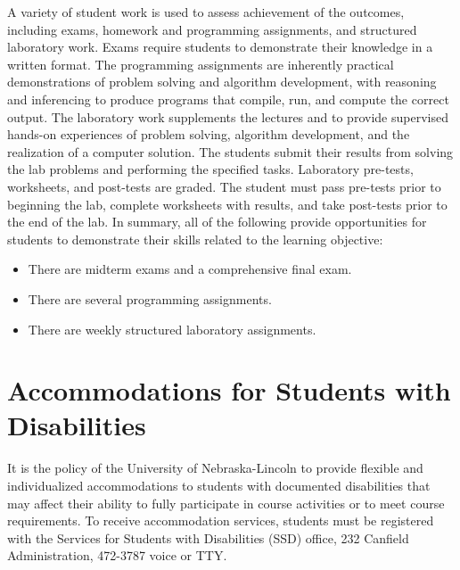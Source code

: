 \documentclass[12pt]{scrartcl}
\begin{document}
A variety of student work is used to assess achievement of the outcomes, including exams, homework and programming assignments, and structured laboratory work.  Exams require students to demonstrate their knowledge in a written format.  The programming assignments are inherently practical demonstrations of problem solving and algorithm development, with reasoning and inferencing to produce programs that compile, run, and compute the correct output. The laboratory work supplements the lectures and to provide supervised hands-on experiences of problem solving, algorithm development, and the realization of a computer solution.  The students submit their results from solving the lab problems and performing the specified tasks.  Laboratory pre-tests, worksheets, and post-tests are graded.  The student must pass pre-tests prior to beginning the lab, complete worksheets with results, and take post-tests prior to the end of the lab.   In summary, all of the following provide opportunities for students to demonstrate their skills related to the learning objective:
\begin{itemize}
  \item There are midterm exams and a comprehensive final exam.   
  \item There are several programming assignments.  
  \item There are weekly structured laboratory assignments.  
\end{itemize}

\section{Accommodations for Students with Disabilities}

It is the policy of the University of Nebraska-Lincoln to 
provide flexible and individualized accommodations to students 
with documented disabilities that may affect their ability to 
fully participate in course activities or to meet course 
requirements.  To receive accommodation services, students 
must be registered with the Services for Students with 
Disabilities (SSD) office, 232 Canfield Administration, 
472-3787 voice or TTY.

%
\end{document}
